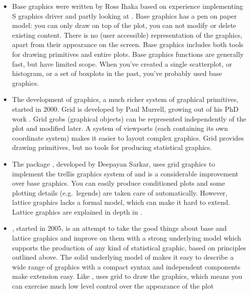 \begin{itemize} 
  \item Base graphics were written by Ross Ihaka based on experience implementing S graphics driver and partly looking at \cite{chambers:1983}.  Base graphics has a pen on paper model: you can only draw on top of the plot, you can not modify or delete existing content.  There is no (user accessible) representation of the graphics, apart from their appearance on the screen. Base graphics includes both tools for drawing primitives and entire plots.  Base graphics functions are generally fast, but have limited scope. When you've created a single scatterplot, or histogram, or a set of boxplots in the past, you've probably used base graphics.

  \item The development of  graphics, a much richer system of graphical primitives, started in 2000.  Grid is developed by Paul Murrell, growing out of his PhD work \citep{murrell:1998}. Grid grobs (graphical objects) can be represented independently of the plot and modified later. A system of viewports (each containing its own coordinate system) makes it easier to layout complex graphics. Grid provides drawing primitives, but no tools for producing statistical graphics.  

  \item The  package \citep{lattice}, developed by Deepayan Sarkar, uses grid graphics to implement the trellis graphics system of \citet{cleveland:1993,cleveland:1994} and is a considerable improvement over base graphics.  You can easily produce conditioned plots and some plotting details (e.g.\ legends) are taken care of automatically.  However, lattice graphics lacks a formal model, which can make it hard to extend.  Lattice graphics are explained in depth in \citep{sarkar:2008}.

  \item \ggplot, started in 2005, is an attempt to take the good things about base and lattice graphics and improve on them with a strong underlying model which supports the production of any kind of statistical graphic, based on principles outlined above.  The solid underlying model of \ggplot makes it easy to describe a wide range of graphics with a compact syntax and independent components make extension easy.  Like , \ggplot uses grid to draw the graphics, which means you can exercise much low level control over the appearance of the plot

\end{itemize}

